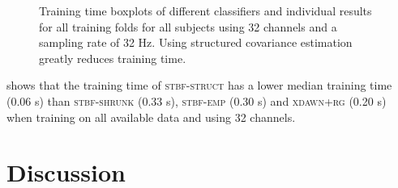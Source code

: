 	\begin{figure}
    \sffamily
    \sansmath
    
    \caption[Classifier training time.]{Training time boxplots of different
    classifiers and individual results for all training folds for all subjects
    using 32 channels and a sampling rate of 32 Hz. Using structured covariance estimation greatly reduces
    training time.}
		\label{fig:stbf-struct/training-time}
	\end{figure}

	 shows that the training time of
  \textsc{stbf-struct} has a lower median training time (0.06 s) than
  \textsc{stbf-shrunk} (0.33 s), \textsc{stbf-emp} (0.30 s) and
  \textsc{xdawn+rg} (0.20 s) when training
  on all available data and using 32 channels.

	\section{Discussion}

